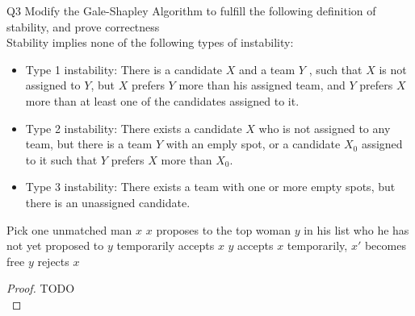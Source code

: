 \begin{problem}
  {Q3}
    Modify the Gale-Shapley Algorithm to fulfill the following definition of stability, and prove correctness \\
    Stability implies none of the following types of instability: \\
    \begin{itemize}
      \item Type 1 instability: There is a candidate $X$ and a team $Y$ , such that
        $X$ is not assigned to $Y$, but $X$ prefers $Y$ more than his assigned team,
        and $Y$ prefers $X$ more than at least one of the candidates assigned
        to it.
      \item Type 2 instability: There exists a candidate $X$ who is not assigned to
        any team, but there is a team $Y$ with an emply spot, or a candidate
        $X_0$ assigned to it such that $Y$ prefers $X$ more than $X_0$.
      \item Type 3 instability: There exists a team with one or more empty
        spots, but there is an unassigned candidate.
    \end{itemize}
    \begin{algorithmic}[1]
      \STATE Pick one unmatched man $x$
      \STATE $x$ proposes to the top woman $y$ in his list who he has not yet proposed to
        \STATE $y$ temporarily accepts $x$
        \STATE $y$ accepts $x$ temporarily, $x'$ becomes free
        \ELSE
        \STATE $y$ rejects $x$
        \ENDIF
      \ENDIF
    \end{algorithmic}
    \begin{proof}
      TODO\\
    \end{proof}
\end{problem}

